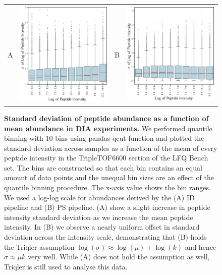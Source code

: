 \documentclass[11pt]{article}
\begin{document}
\begin{figure}[hbt]
    \centering
    \centering
    \begin{tabular}{lclc} 
        A & \includegraphics[width=0.4\linewidth]{../../result/report_plots_pipeline/quantile_bins_ID_median.png} &
        B & \includegraphics[width=0.4\linewidth]{../../result/report_plots_pipeline/quantile_bins_PS_median.png} \\
    \end{tabular}
  \caption{{\bf Standard deviation of peptide abundance as a function of mean abundance in DIA experiments.} We performed quantile binning with 10 bins using pandas qcut function and plotted the standard deviation across samples as a function of the mean of every peptide intensity in the TripleTOF6600 section of the LFQ Bench set. The bins are constructed so that each bin contains an equal amount of data points and the unequal bin sizes are an effect of the quantile binning procedure. The x-axis value shows the bin ranges. We used a log-log scale for abundances derived by the (A) ID pipeline and (B) PS pipeline. (A) show a slight increase in peptide intensity standard deviation as we increase the mean peptide intensity. In (B) we observe a nearly uniform offset in standard deviation across the intensity scale, demonstrating that (B) holds the Triqler assumption $\log(\sigma) \approx \log(\mu) + \log(k)$ and hence   $\sigma \approx \mu k$ very well. While (A) does not hold the assumption as well, Triqler is still used to analyse this data.  \label{fig:uniform_offset_in_standard_deviation_boxplot}}

 \end{figure}
 
\end{document}
